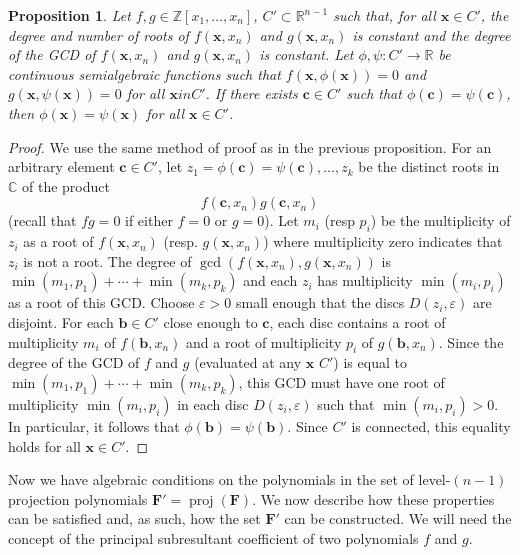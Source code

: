 \documentclass[
]{book}
\newtheorem{proposition}{Proposition}[chapter]
\theoremstyle{definition}
\theoremstyle{definition}
\theoremstyle{definition}
\theoremstyle{definition}
\theoremstyle{remark}
\begin{document}
\begin{proposition}
\citep[Proposition 2.18]{coste2000}
Let \(f,g \in \mathbb{Z}[x_1,\ldots,x_n]\), \(C' \subset \mathbb{R}^{n-1}\) such that, for all \(\mathbf{x} \in C'\), the degree and number of roots of \(f(\mathbf{x},x_n)\) and \(g(\mathbf{x},x_n)\) is constant and the degree of the GCD of \(f(\mathbf{x},x_n)\) and \(g(\mathbf{x},x_n)\) is constant.
Let \(\phi,\psi : C' \to \mathbb{R}\) be continuous semialgebraic functions such that \(f(\mathbf{x},\phi(\mathbf{x})) = 0\) and \(g(\mathbf{x},\psi(\mathbf{x})) = 0\) for all \(\mathbf{x} in C'\).
If there exists \(\mathbf{c} \in C'\) such that \(\phi(\mathbf{c}) = \psi(\mathbf{c})\), then \(\phi(\mathbf{x}) = \psi(\mathbf{x})\) for all \(\mathbf{x} \in C'\).
\end{proposition}

\begin{proof}
We use the same method of proof as in the previous proposition.
For an arbitrary element \(\mathbf{c} \in C'\), let \(z_1 = \phi(\mathbf{c}) = \psi(\mathbf{c}), \ldots, z_k\) be the distinct roots in \(\mathbb{C}\) of the product
\[
f(\mathbf{c},x_n) g(\mathbf{c},x_n)
\]
(recall that \(fg = 0\) if either \(f=0\) or \(g=0\)).
Let \(m_i\) (resp \(p_i\)) be the multiplicity of \(z_i\) as a root of \(f(\mathbf{x},x_n)\) (resp. \(g(\mathbf{x}, x_n)\)) where multiplicity zero indicates that \(z_i\) is not a root.
The degree of \(\gcd(f(\mathbf{x}, x_n), g(\mathbf{x}, x_n))\) is \(\min(m_1,p_1) + \cdots + \min(m_k,p_k)\) and each \(z_i\) has multiplicity \(\min(m_i,p_i)\) as a root of this GCD.
Choose \(\varepsilon > 0\) small enough that the discs \(D(z_i,\varepsilon)\) are disjoint.
For each \(\mathbf{b} \in C'\) close enough to \(\mathbf{c}\), each disc contains a root of multiplicity \(m_i\) of \(f(\mathbf{b}, x_n)\) and a root of multiplicity \(p_i\) of \(g(\mathbf{b}, x_n)\). Since the degree of the GCD of \(f\) and \(g\) (evaluated at any \(\mathbf{x}\) \in \(C'\)) is equal to \(\min(m_1,p_1) + \cdots + \min(m_k,p_k)\), this GCD must have one root of multiplicity \(\min(m_i,p_i)\) in each disc \(D(z_i,\varepsilon)\) such that \(\min(m_i,p_i) > 0\).
In particular, it follows that \(\phi(\mathbf{b}) = \psi(\mathbf{b})\). Since \(C'\) is connected, this equality holds for all \(\mathbf{x} \in C'\).
\end{proof}

Now we have algebraic conditions on the polynomials in the set of level-\((n-1)\) projection polynomials \(\mathbf{F}' = \operatorname{proj}(\mathbf{F})\). We now describe how these properties can be satisfied and, as such, how the set \(\mathbf{F}'\) can be constructed. We will need the concept of the principal subresultant coefficient of two polynomials \(f\) and \(g\).
\end{document}

